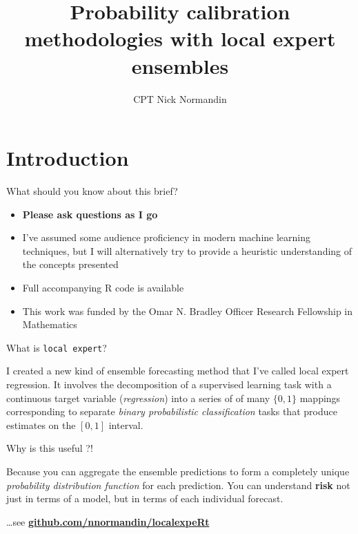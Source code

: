 \documentclass[ignorenonframetext,]{beamer}
\title{Probability calibration methodologies with local expert ensembles}
\subtitle{CPT Nick Normandin}
\date{}
\providecommand{\tightlist}{%
\setlength{\itemsep}{0pt}\setlength{\parskip}{0pt}}
\begin{document}
\frame{\titlepage}

\section{Introduction}\label{introduction}

\begin{frame}{What should you know about this brief?}

\begin{itemize}[<+->]
\tightlist
\item
  \textbf{Please ask questions as I go}
\item
  I've assumed some audience proficiency in modern machine learning
  techniques, but I will alternatively try to provide a heuristic
  understanding of the concepts presented
\item
  Full accompanying R code is available
\item
  This work was funded by the Omar N. Bradley Officer Research
  Fellowship in Mathematics
\end{itemize}

\end{frame}

\begin{frame}{What is \texttt{local\ expert}?}

I created a new kind of ensemble forecasting method that I've called
local expert regression. It involves the decomposition of a supervised
learning task with a continuous target variable (\emph{regression}) into
a series of of many \(\{0, 1\}\) mappings corresponding to separate
\emph{binary probabilistic classification} tasks that produce estimates
on the \([0, 1]\) interval.

\begin{block}{Why is this useful ?!}

Because you can aggregate the ensemble predictions to form a completely
unique \emph{probability distribution function} for each prediction. You
can understand \textbf{risk} not just in terms of a model, but in terms
of each individual forecast.

\end{block}

\begin{block}{\ldots{}see
\textbf{\href{https://github.com/nnormandin/localexpeRt}{github.com/nnormandin/localexpeRt}}}

\end{block}

\end{frame}
\end{document}
